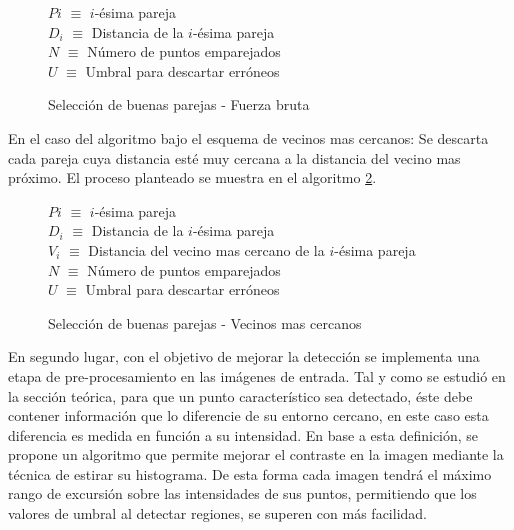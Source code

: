 \begin{figure}[h]
	\centering
	\begin{minipage}{.7\linewidth}
		\begin{algorithm}[H] %
			\caption{Selección de buenas parejas - Fuerza bruta}
			\label{fuerzabruta}
			\SetAlgoLined
			$P{i}$ $\equiv$  $i$-ésima pareja\\
			$D_{i}$ $\equiv$ Distancia de la $i$-ésima pareja\\
			$N$ $\equiv$ Número de puntos emparejados\\
			$U$ $\equiv$ Umbral para descartar erróneos\\
		\end{algorithm}
	\end{minipage}
\end{figure}

En el caso del algoritmo bajo el esquema de vecinos mas cercanos: Se descarta cada pareja cuya distancia esté muy cercana a la distancia del vecino mas próximo. El proceso planteado se muestra en el algoritmo \ref{vecinosmascercanos}.

\begin{figure}[h]
	\centering
	\begin{minipage}{.75\linewidth}
		\begin{algorithm}[H] %
			\caption{Selección de buenas parejas - Vecinos mas cercanos}
			\label{vecinosmascercanos}
			\SetAlgoLined
			$P{i}$ $\equiv$ $i$-ésima pareja\\
			$D_{i}$ $\equiv$ Distancia de la $i$-ésima pareja\\
			$V_{i}$ $\equiv$ Distancia del vecino mas cercano de la $i$-ésima pareja\\
			$N$ $\equiv$ Número de puntos emparejados\\
			$U$ $\equiv$ Umbral para descartar erróneos\\
		\end{algorithm}
	\end{minipage}
\end{figure}

En segundo lugar, con el objetivo de mejorar la detección se implementa una etapa de pre-procesamiento en las imágenes de entrada. Tal y como se estudió en la sección teórica, para que un punto característico sea detectado, éste debe contener información que lo diferencie de su entorno cercano, en este caso esta diferencia es medida en función a su intensidad. En base a esta definición, se propone un algoritmo que permite mejorar el contraste en la imagen mediante la técnica de estirar su histograma. De esta forma cada imagen tendrá el máximo rango de excursión sobre las intensidades de sus puntos, permitiendo que los valores de umbral al detectar regiones, se superen con más facilidad.

